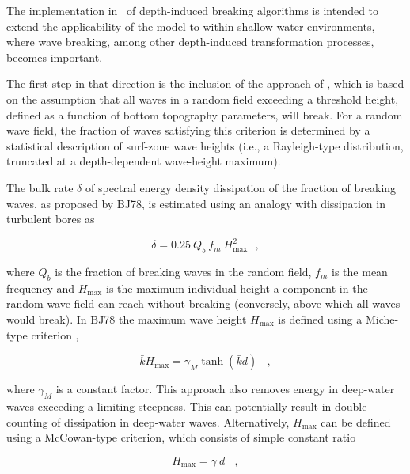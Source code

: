 The implementation in \ws\ of depth-induced breaking algorithms is intended to
extend the applicability of the model to within shallow water environments,
where wave breaking, among other depth-induced transformation processes,
becomes important.

The first step in that direction is the inclusion of the approach of
\citet[][henceforth denoted as BJ78]{pro:BJ78}, which is based on the
assumption that all waves in a random field exceeding a threshold height,
defined as a function of bottom topography parameters, will break. For a
random wave field, the fraction of waves satisfying this criterion is
determined by a statistical description of surf-zone wave heights (i.e., a
Rayleigh-type distribution, truncated at a depth-dependent wave-height
maximum).

The bulk rate $\delta$ of spectral energy density dissipation of the fraction
of breaking waves, as proposed by BJ78, is estimated using an analogy with
dissipation in turbulent bores as


\begin{equation}
\delta = 0.25 \: Q_b \: f_m \: H_{\max}^2 \:\:\: , \label{eq:BJ78_base}
\end{equation}

\noindent
where $Q_b$ is the fraction of breaking waves in the random field, $f_m$ is
the mean frequency and $H_{\max}$ is the maximum individual height a component
in the random wave field can reach without breaking (conversely, above which
all waves would break). In BJ78 the maximum wave height $H_{\max}$ is defined
using a Miche-type criterion \citep{art:Miche44},


\begin{equation}
\bar{k} H_{\max} = \gamma_M \tanh ( \bar{k} d )
\:\:\:\ , \label{eq:BJ78_Miche}
\end{equation}

\noindent
where $\gamma_M$ is a constant factor. This approach also removes energy in
deep-water waves exceeding a limiting steepness. This can potentially result
in double counting of dissipation in deep-water waves. Alternatively,
$H_{\max}$ can be defined using a McCowan-type criterion, which consists of
simple constant ratio


\begin{equation}
H_{\max} = \gamma \: d \:\:\:\ , \label{eq:BJ78_McC}
\end{equation}

